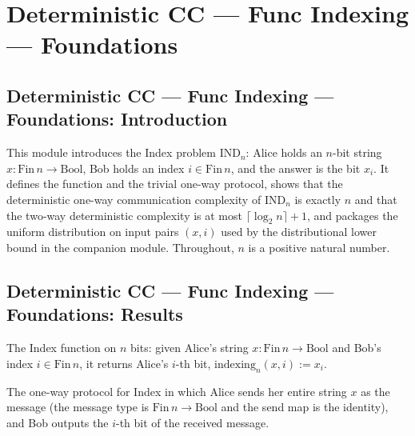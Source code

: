\section{Deterministic CC --- Func Indexing --- Foundations}
\subsection*{Deterministic CC --- Func Indexing --- Foundations: Introduction}

This module introduces the Index problem $\mathrm{IND}_n$: Alice holds an $n$-bit string
$x : \mathrm{Fin}\,n \to \mathrm{Bool}$, Bob holds an index $i \in \mathrm{Fin}\,n$, and the
answer is the bit $x_i$.  It defines the function and the trivial one-way protocol, shows
that the deterministic one-way communication complexity of $\mathrm{IND}_n$ is exactly $n$
and that the two-way deterministic complexity is at most $\lceil \log_2 n \rceil + 1$, and
packages the uniform distribution on input pairs $(x, i)$ used by the distributional lower
bound in the companion module.  Throughout, $n$ is a positive natural number.

\subsection*{Deterministic CC --- Func Indexing --- Foundations: Results}

\begin{definition}
\label{CommunicationComplexity.Functions.Indexing.indexing}
\leanok
The Index function on $n$ bits: given Alice's string $x : \mathrm{Fin}\,n \to \mathrm{Bool}$
and Bob's index $i \in \mathrm{Fin}\,n$, it returns Alice's $i$-th bit,
$\mathrm{indexing}_n(x, i) := x_i$.
\end{definition}

\begin{definition}
\label{CommunicationComplexity.Functions.Indexing.trivialProtocol}
\leanok
{}
The one-way protocol for Index in which Alice sends her entire string $x$ as the message
(the message type is $\mathrm{Fin}\,n \to \mathrm{Bool}$ and the send map is the identity),
and Bob outputs the $i$-th bit of the received message.
\end{definition}

